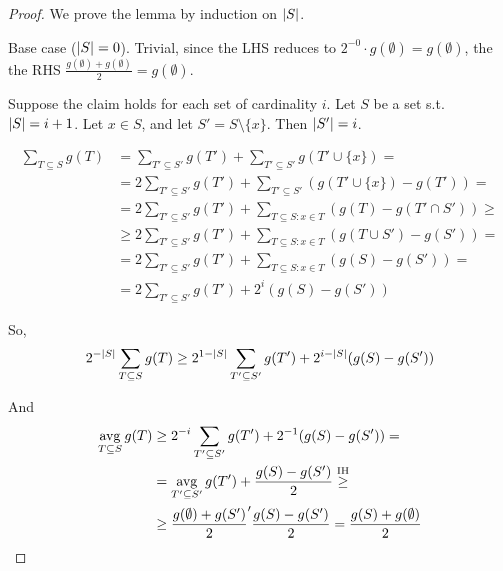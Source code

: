     \begin{proof}
        We prove the lemma by induction on $\vert S \vert$.

        Base case ($\vert S \vert = 0$). Trivial, since the LHS reduces to $2^{-0} \cdot g(\emptyset) = g(\emptyset)$, the the RHS $\frac{g(\emptyset) + g(\emptyset)}{2} = g(\emptyset)$.

        Suppose the claim holds for each set of cardinality $i$.
        Let $S$ be a set s.t. $\vert S \vert = i+1$.
        Let $x \in S$, and let $S' = S \setminus \{x\}$. Then $\vert S' \vert = i$.

        \begin{equation*}
            \begin{split}
                \sum_{T \subseteq S} g(T) &= \sum_{T' \subseteq S'} g(T') + \sum_{T' \subseteq S'} g(T' \cup \{x\}) =\\
                    &= 2 \sum_{T' \subseteq S'} g(T') + \sum_{T' \subseteq S'} (g(T' \cup \{x\}) - g(T')) =\\
                    &= 2 \sum_{T' \subseteq S'} g(T') + \sum_{T \subseteq S : x \in T} (g(T) - g(T' \cap S')) \geq\\
                    &\geq 2 \sum_{T' \subseteq S'} g(T') + \sum_{T \subseteq S : x \in T} (g(T \cup S') - g(S')) =\\
                    &= 2 \sum_{T' \subseteq S'} g(T') + \sum_{T \subseteq S : x \in T} (g(S) - g(S')) =\\
                    &= 2 \sum_{T' \subseteq S'} g(T') + 2^i (g(S) - g(S'))
            \end{split}
        \end{equation*}

        So,
        \[ 2^{- \vert S \vert} \sum_{T \subseteq S} g(T) \geq 2^{1 - \vert S \vert} \sum_{T' \subseteq S'} g(T') + 2^{i - \vert S \vert} (g(S) - g(S')) \]

        And
        \begin{equation*}
            \begin{split}
                \operatorname*{avg}_{T \subseteq S} g(T) &\geq 2^{-i} \sum_{T' \subseteq S'} g(T') + 2^{-1} (g(S) - g(S')) =\\
                    &= \operatorname*{avg}_{T' \subseteq S'} g(T') + \frac{g(S) - g(S')}{2} \overset{\text{IH}}{\geq}\\
                    &\geq \frac{g(\emptyset) + g(S')}{2} ' \frac{g(S) - g(S')}{2} = \frac{g(S) + g(\emptyset)}{2}
            \end{split}
        \end{equation*}
    \end{proof}

